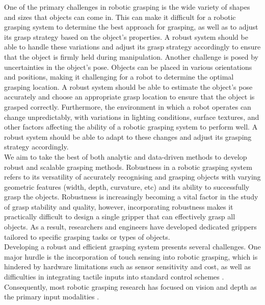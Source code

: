 \documentclass[11pt, a4paper]{report}
\begin{document}
One of the primary challenges in robotic grasping is the wide variety of shapes and sizes that objects can come in. This can make it difficult for a robotic grasping system to determine the best approach for grasping, as well as to adjust its grasp strategy based on the object's properties. A robust system should be able to handle these variations and adjust its grasp strategy accordingly to ensure that the object is firmly held during manipulation. Another challenge is posed by uncertainties in the object's pose. Objects can be placed in various orientations and positions, making it challenging for a robot to determine the optimal grasping location. A robust system should be able to estimate the object's pose accurately and choose an appropriate grasp location to ensure that the object is grasped correctly. Furthermore, the environment in which a robot operates can change unpredictably, with variations in lighting conditions, surface textures, and other factors affecting the ability of a robotic grasping system to perform well. A robust system should be able to adapt to these changes and adjust its grasping strategy accordingly.\\


We aim to take the best of both analytic \cite{haschke2005} and data-driven methods \cite{berscheid2020selfsupervised, pinto2015supersizing} to develop robust and scalable grasping methods. Robustness in a robotic grasping system refers to its versatility of accurately recognising and grasping objects with varying geometric features (width, depth, curvature, etc) and its ability to successfully grasp the objects. Robustness is increasingly becoming a vital factor in the study of grasp stability and quality, however, incorporating robustness makes it practically difficult to design a single gripper that can effectively grasp all objects. As a result, researchers and engineers have developed dedicated grippers tailored to specific grasping tasks or types of objects.\\

Developing a robust and efficient grasping system presents several challenges. One major hurdle is the incorporation of touch sensing into robotic grasping, which is hindered by hardware limitations such as sensor sensitivity and cost, as well as difficulties in integrating tactile inputs into standard control schemes \cite{Calandra_2018}. Consequently, most robotic grasping research has focused on vision and depth as the primary input modalities \cite{Calandra_2018, de_Farias_2021}.\\
\end{document}
